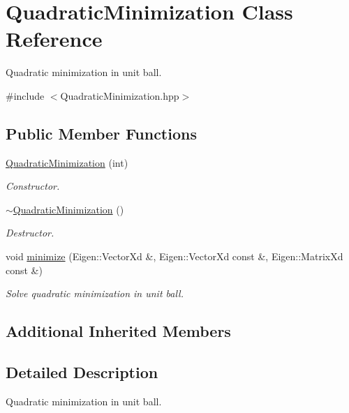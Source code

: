 \hypertarget{class_quadratic_minimization}{}\section{Quadratic\+Minimization Class Reference}
\label{class_quadratic_minimization}


Quadratic minimization in unit ball.  




{\ttfamily \#include $<$Quadratic\+Minimization.\+hpp$>$}

\subsection*{Public Member Functions}
\begin{DoxyCompactItemize}
\item 
\hyperlink{class_quadratic_minimization_ae2f47a7103f9ca70837916a35bebdbd6}{Quadratic\+Minimization} (int)
\begin{DoxyCompactList}\small\item\em Constructor. \end{DoxyCompactList}\item 
\hyperlink{class_quadratic_minimization_a3b70ac4af49f9a0fc144caaa7346e17b}{$\sim$\+Quadratic\+Minimization} ()\hypertarget{class_quadratic_minimization_a3b70ac4af49f9a0fc144caaa7346e17b}{}\label{class_quadratic_minimization_a3b70ac4af49f9a0fc144caaa7346e17b}

\begin{DoxyCompactList}\small\item\em Destructor. \end{DoxyCompactList}\item 
void \hyperlink{class_quadratic_minimization_a476344b803ff755606dc091b9256ab3b}{minimize} (Eigen\+::\+Vector\+Xd \&, Eigen\+::\+Vector\+Xd const \&, Eigen\+::\+Matrix\+Xd const \&)
\begin{DoxyCompactList}\small\item\em Solve quadratic minimization in unit ball. \end{DoxyCompactList}\end{DoxyCompactItemize}
\subsection*{Additional Inherited Members}


\subsection{Detailed Description}
Quadratic minimization in unit ball. 

